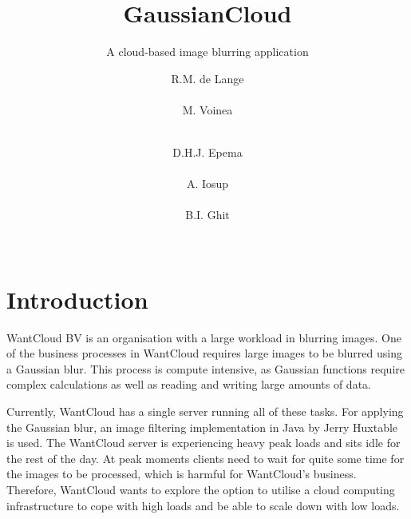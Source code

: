 \documentclass{acm_proc_article-sp}
\begin{document}
\title{GaussianCloud}
\subtitle{A cloud-based image blurring application}

\author{
\alignauthor
R.M. de Lange\\
		\\
\alignauthor
M. Voinea\\
		\\
\and
\alignauthor
D.H.J. Epema\\
		\\
\alignauthor
A. Iosup\\
		\\
\alignauthor
B.I. Ghit\\
		\\
}

\maketitle

\begin{abstract}
\end{abstract}

\section{Introduction}
\label{sec:intro}
WantCloud BV is an organisation with a large workload in blurring images.
One of the business processes in WantCloud requires large images to be blurred using a Gaussian blur.
This process is compute intensive, as Gaussian functions require complex calculations as well as reading and writing large amounts of data.

Currently, WantCloud has a single server running all of these tasks.
For applying the Gaussian blur, an image filtering implementation in Java by Jerry Huxtable is used.\cite{web:huxtable}
The WantCloud server is experiencing heavy peak loads and sits idle for the rest of the day.
At peak moments clients need to wait for quite some time for the images to be processed, which is harmful for WantCloud's business.
Therefore, WantCloud wants to explore the option to utilise a cloud computing infrastructure to cope with high loads and be able to scale down with low loads.
\end{document}

